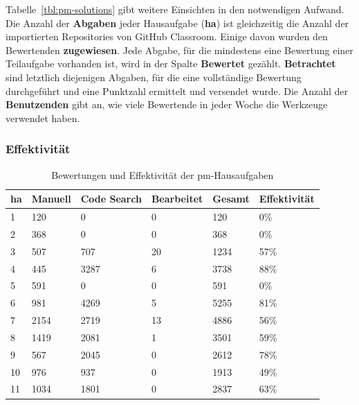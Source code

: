 Tabelle~\ref{tbl:pm-solutions} gibt weitere Einsichten in den notwendigen Aufwand.
Die Anzahl der \textbf{Abgaben} jeder Hausaufgabe (\textbf{\acs{ha}}) ist gleichzeitig die Anzahl der importierten Repositories von GitHub Classroom.
Einige davon wurden den Bewertenden \textbf{zugewiesen}.
Jede Abgabe, für die mindestens eine Bewertung einer Teilaufgabe vorhanden ist, wird in der Spalte \textbf{Bewertet} gezählt.
\textbf{Betrachtet} sind letztlich diejenigen Abgaben, für die eine vollständige Bewertung durchgeführt und eine Punktzahl ermittelt und versendet wurde.
Die Anzahl der \textbf{Benutzenden} gibt an, wie viele Bewertende in jeder Woche die Werkzeuge verwendet haben.

\subsubsection{Effektivität}

\begin{table}
    \centering
    \caption{Bewertungen und Effektivität der \ac{pm}-Hausaufgaben}
    \begin{tabular}{|l|l|l|l|l|l|}
    \hline
        \acs{ha} & Manuell & Code Search & Bearbeitet & Gesamt & Effektivität  \\ \hline
        1   & 120  & 0    & 0  & 120  &  0\%  \\ \hline
        2   & 368  & 0    & 0  & 368  &  0\%  \\ \hline
        3   & 507  & 707  & 20 & 1234 & 57\%  \\ \hline
        4   & 445  & 3287 & 6  & 3738 & 88\%  \\ \hline
        5   & 591  & 0    & 0  & 591  &  0\%  \\ \hline
        6   & 981  & 4269 & 5  & 5255 & 81\%  \\ \hline
        7   & 2154 & 2719 & 13 & 4886 & 56\%  \\ \hline
        8   & 1419 & 2081 & 1  & 3501 & 59\%  \\ \hline
        9   & 567  & 2045 & 0  & 2612 & 78\%  \\ \hline
        10  & 976  & 937  & 0  & 1913 & 49\%  \\ \hline
        11  & 1034 & 1801 & 0  & 2837 & 63\%  \\ \hline
    \end{tabular}
    \label{tbl:pm-effectiveness}
\end{table}


